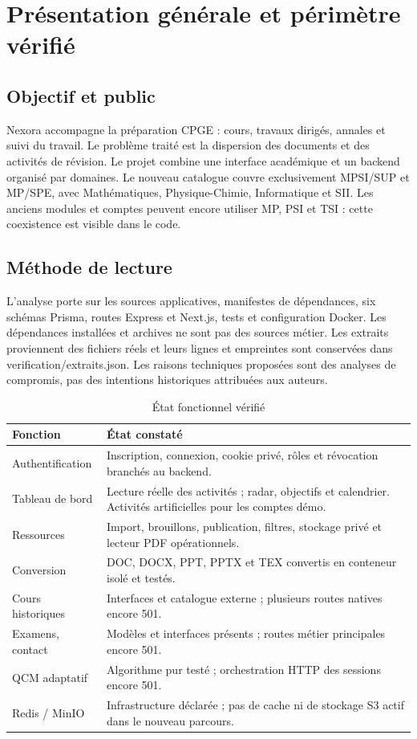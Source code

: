 \chapter{Présentation générale et périmètre vérifié}
\section{Objectif et public}
Nexora accompagne la préparation CPGE : cours, travaux dirigés, annales et suivi du travail. Le problème traité est la dispersion des documents et des activités de révision. Le projet combine une interface académique et un backend organisé par domaines. Le nouveau catalogue couvre exclusivement MPSI/SUP et MP/SPE, avec Mathématiques, Physique-Chimie, Informatique et SII. Les anciens modules et comptes peuvent encore utiliser MP, PSI et TSI : cette coexistence est visible dans le code.

\section{Méthode de lecture}
L’analyse porte sur les sources applicatives, manifestes de dépendances, six schémas Prisma, routes Express et Next.js, tests et configuration Docker. Les dépendances installées et archives ne sont pas des sources métier. Les extraits proviennent des fichiers réels et leurs lignes et empreintes sont conservées dans verification/extraits.json. Les raisons techniques proposées sont des analyses de compromis, pas des intentions historiques attribuées aux auteurs.

\begin{table}[ht]\centering\small\begin{tabularx}{\textwidth}{lX}\toprule Fonction & État constaté \\\midrule
Authentification & Inscription, connexion, cookie privé, rôles et révocation branchés au backend. \\
Tableau de bord & Lecture réelle des activités ; radar, objectifs et calendrier. Activités artificielles pour les comptes démo. \\
Ressources & Import, brouillons, publication, filtres, stockage privé et lecteur PDF opérationnels. \\
Conversion & DOC, DOCX, PPT, PPTX et TEX convertis en conteneur isolé et testés. \\
Cours historiques & Interfaces et catalogue externe ; plusieurs routes natives encore 501. \\
Examens, contact & Modèles et interfaces présents ; routes métier principales encore 501. \\
QCM adaptatif & Algorithme pur testé ; orchestration HTTP des sessions encore 501. \\
Redis / MinIO & Infrastructure déclarée ; pas de cache ni de stockage S3 actif dans le nouveau parcours. \\\bottomrule\end{tabularx}\caption{État fonctionnel vérifié}\end{table}
